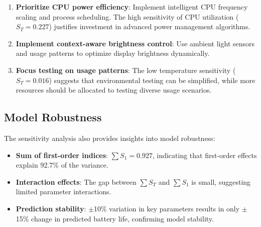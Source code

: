 \begin{enumerate}[noitemsep]
    \item \textbf{Prioritize CPU power efficiency}:
    Implement intelligent CPU frequency scaling and process scheduling. The high sensitivity of CPU utilization ($S_T = 0.227$) justifies investment in advanced power management algorithms.
    
    \item \textbf{Implement context-aware brightness control}:
    Use ambient light sensors and usage patterns to optimize display brightness dynamically.
    
    \item \textbf{Focus testing on usage patterns}:
    The low temperature sensitivity ($S_T = 0.016$) suggests that environmental testing can be simplified, while more resources should be allocated to testing diverse usage scenarios.
\end{enumerate}

\subsection{Model Robustness}

The sensitivity analysis also provides insights into model robustness:

\begin{itemize}[noitemsep]
    \item \textbf{Sum of first-order indices}: $\sum S_1 = 0.927$, indicating that first-order effects explain 92.7\% of the variance.
    \item \textbf{Interaction effects}: The gap between $\sum S_T$ and $\sum S_1$ is small, suggesting limited parameter interactions.
    \item \textbf{Prediction stability}: $\pm$10\% variation in key parameters results in only $\pm$15\% change in predicted battery life, confirming model stability.
\end{itemize}
